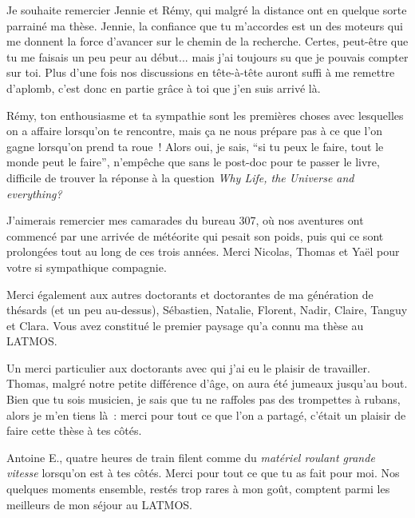 {%
Je souhaite remercier Jennie et Rémy, qui malgré la distance ont en quelque sorte parrainé ma thèse.
Jennie, la confiance que tu m'accordes est un des moteurs qui me donnent la force d'avancer sur le chemin de la recherche.
Certes, peut-être que tu me faisais un peu peur au début... mais j'ai toujours su que je pouvais compter sur toi.
Plus d'une fois nos discussions en tête-à-tête auront suffi à me remettre d'aplomb, c'est donc en partie grâce à toi que j'en suis arrivé là.

\noindent
Rémy, ton enthousiasme et ta sympathie sont les premières choses avec lesquelles on a affaire lorsqu'on te rencontre, mais ça ne nous prépare pas à ce que l'on gagne lorsqu'on prend ta roue~! 
Alors oui, je sais, ``si tu peux le faire, tout le monde peut le faire'', n'empêche que sans le post-doc pour te passer le livre, difficile de trouver la réponse à la question \textit{Why Life, the Universe and everything?}
\vspace{1em}

J'aimerais remercier mes camarades du bureau 307, où nos aventures ont commencé par une arrivée de météorite qui pesait son poids, puis qui ce sont prolongées tout au long de ces trois années. Merci Nicolas, Thomas et Yaël pour votre si sympathique compagnie.

\noindent
Merci également aux autres doctorants et doctorantes de ma génération de thésards (et un peu au-dessus), Sébastien, Natalie, Florent, Nadir, Claire, Tanguy et Clara. Vous avez constitué le premier paysage qu'a connu ma thèse au LATMOS.
\vspace{1em}

Un merci particulier aux doctorants avec qui j'ai eu le plaisir de travailler. 
Thomas, malgré notre petite différence d'âge, on aura été jumeaux jusqu'au bout. Bien que tu sois musicien, je sais que tu ne raffoles pas des trompettes à rubans, alors je m'en tiens là~: merci pour tout ce que l'on a partagé, c'était un plaisir de faire cette thèse à tes côtés.

\noindent
Antoine E., quatre heures de train filent comme du \textit{matériel roulant grande vitesse} lorsqu'on est à tes côtés. Merci pour tout ce que tu as fait pour moi. Nos quelques moments ensemble, restés trop rares à mon goût, comptent parmi les meilleurs de mon séjour au LATMOS.

}

